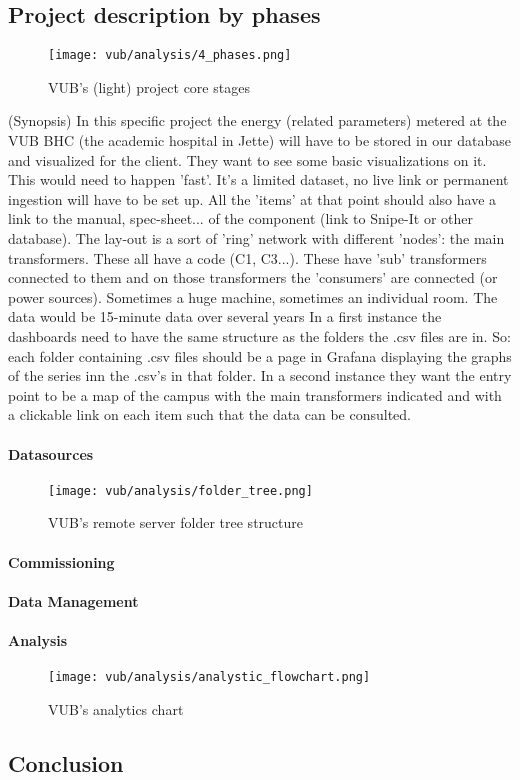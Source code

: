 \subsection{Project description by phases}
\begin{figure}[ht]
    \texttt{[image: vub/analysis/4\_phases.png]}
    \caption{\ac{VUB}'s (light) project core stages}
    \label{fig:vub_stages}
\end{figure}
(Synopsis)
In this specific project the energy (related parameters) metered at the VUB BHC (the academic hospital in Jette) will have to be stored in our database and visualized for the client. 
They want to see some basic visualizations on it. This would need to happen 'fast'.
It's a limited dataset, no live link or permanent ingestion will have to be set up.
All the 'items' at that point should also have a link to the manual, spec-sheet... of the component (link to Snipe-It or other database).
The lay-out is a sort of 'ring' network with different 'nodes': the main transformers. These all have a code (C1, C3...). 
These have 'sub' transformers connected to them and on those transformers the 'consumers' are connected (or power sources). Sometimes a huge machine, sometimes an individual room.
The data would be 15-minute data over several years
In a first instance the dashboards need to have the same structure as the folders the .csv files are in. So: each folder containing .csv files should be a page in Grafana 
displaying the graphs of the series inn the .csv's in that folder.
In a second instance they want the entry point to be a map of the campus with the main transformers indicated and with a clickable link on each item such that the data can be consulted. 

\paragraph{Datasources}
\begin{figure}[ht]
    \texttt{[image: vub/analysis/folder\_tree.png]}
    \caption{\ac{VUB}'s remote server folder tree structure}
    \label{fig:vub_folder_tree}
\end{figure}

\paragraph{Commissioning}

\paragraph{Data Management}

\paragraph{Analysis}
\begin{figure}[ht]
    \texttt{[image: vub/analysis/analystic\_flowchart.png]}
    \caption{\ac{VUB}'s analytics chart}
    \label{fig:vub_anal_chart}
\end{figure}


\subsection{Conclusion}
